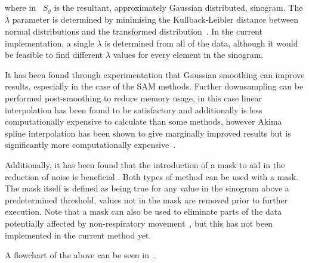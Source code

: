                 \noindent where in~ $S_g$ is the resultant, approximately Gaussian distributed, sinogram. The $\lambda$ parameter is determined by minimising the Kullback-Leibler distance between normal distributions and the transformed distribution~. In the current implementation, a single $\lambda$ is determined from all of the data, although it would be feasible to find different $\lambda$ values for every element in the sinogram.
                    
                It has been found through experimentation that Gaussian smoothing can improve results, especially in the case of the \gls{SAM} methods. Further downsampling can be performed post-smoothing to reduce memory usage, in this case linear interpolation has been found to be satisfactory and additionally is less computationally expensive to calculate than some methods, however Akima spline interpolation has been shown to give marginally improved results but is significantly more computationally expensive~.
                        
                Additionally, it has been found that the introduction of a mask to aid in the reduction of noise is beneficial . Both types of method can be used with a mask. The mask itself is defined as being true for any value in the sinogram above a predetermined threshold, values not in the mask are removed prior to further execution. Note that a mask can also be used to eliminate parts of the data potentially affected by non-respiratory movement~, but this has not been implemented in the current method yet.
                
                A flowchart of the above can be seen in~.
            
